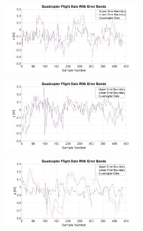 \begin{figure}
  \centering
  \begin{subfigure}{0.48\textwidth}
    \begin{subfigure}{\textwidth}
      \includegraphics[clip, trim = 80 0 100 0, width = \textwidth]{figures/chapter5/ts_x}
    \end{subfigure}
    \begin{subfigure}{\textwidth}
      \includegraphics[clip, trim = 80 0 100 0, width = \textwidth]{figures/chapter5/ts_y}
    \end{subfigure}
    \begin{subfigure}{\textwidth}
      \includegraphics[clip, trim = 80 0 100 0, width = \textwidth]{figures/chapter5/ts_z}

\end{subfigure}
\end{subfigure}
\end{figure}
